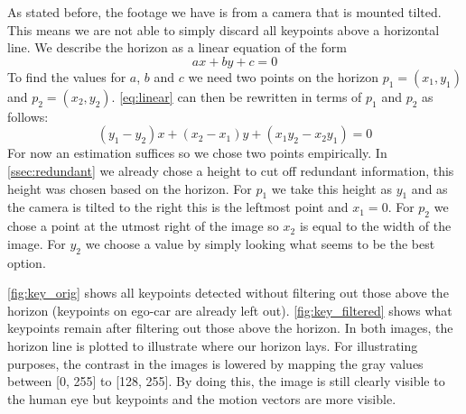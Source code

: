 As stated before, the footage we have is from a camera that is mounted tilted. This means we are not able to simply discard all keypoints above a horizontal line. We describe the horizon as a linear equation of the form
\begin{equation}\label{eq:linear}
    ax + by + c = 0
\end{equation}
To find the values for $a$, $b$ and $c$ we need two points on the horizon $p_1 = (x_1, y_1)$ and $ p_2 = (x_2, y_2)$. \autoref{eq:linear} can then be rewritten in terms of $p_1$ and $p_2$ as follows:
\begin{equation}
    (y_1-y_2)x + (x_2-x_1)y + (x_1y_2-x_2y_1) = 0
\end{equation}
For now an estimation suffices so we chose two points empirically. In \autoref{ssec:redundant} we already chose a height to cut off redundant information, this height was chosen based on the horizon. For $p_1$ we take this height as $y_1$ and as the camera is tilted to the right this is the leftmost point and $x_1 = 0$. For $p_2$ we chose a point at the utmost right of the image so $x_2$ is equal to the width of the image. For $y_2$ we choose a value by simply looking what seems to be the best option. \bigskip

\autoref{fig:key_orig} shows all keypoints detected without filtering out those above the horizon (keypoints on ego-car are already left out). \autoref{fig:key_filtered} shows what keypoints remain after filtering out those above the horizon. In both images, the horizon line is plotted to illustrate where our horizon lays. For illustrating purposes, the contrast in the images is lowered by mapping the gray values between [0, 255] to [128, 255]. By doing this, the image is still clearly visible to the human eye but keypoints and the motion vectors are more visible.

